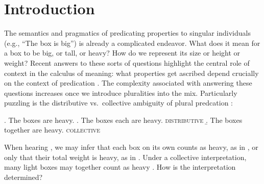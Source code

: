 \documentclass[preprint,12pt,authoryear,titlepage]{elsarticle}
\begin{document}


\section{Introduction}


The semantics and pragmatics of predicating properties to singular individuals (e.g., ``The box is big'') is already a complicated endeavor. What does it mean for a box to be big, or tall, or heavy? How do we represent its size or height or weight? Recent answers to these sorts of questions highlight the central role of context in the calculus of meaning: what properties get ascribed depend crucially on the context of predication \citep[cf.~tall for a boy vs.~tall for a basketball player;  e.g.,][]{kamppartee1995,kennedy1999,lassitergoodman2013}. The complexity associated with answering these questions increases once we introduce pluralities into the mix. 
Particularly puzzling is the distributive vs.~collective ambiguity of plural predcation \citep[e.g.,][]{link1983,link1987,link1998,scha1984,landman1989,landman1989b,landman1996,lasersohn1988,lasersohn1990,lasersohn1995,lasersohn1998,schwarzschild1994,schwarzschild1996}:

\ex. \label{boxes} The boxes are heavy.
\a. \label{boxeseach} The boxes each are heavy. \hfill \textsc{distributive}
\b. \label{boxestogether}The boxes together are heavy. \hfill \textsc{collective}

When hearing \Last, we may infer that each box on its own counts as heavy, as in \Last[a], or only that their total weight is heavy, as in \Last[b]. Under a collective interpretation, many light boxes may together count as heavy \citep{scha1984}.
How is the interpretation determined?
\end{document}
